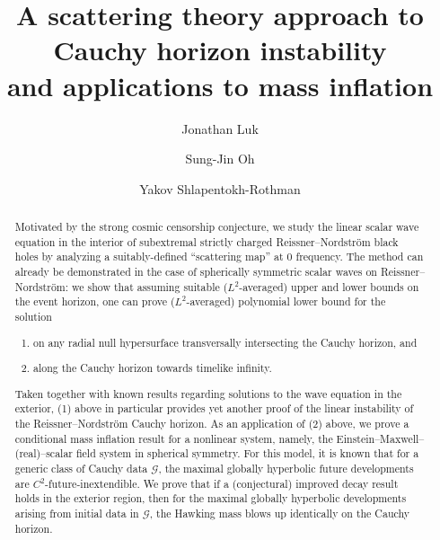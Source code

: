 \documentclass[10pt, reqno]{amsart}
\theoremstyle{definition}
\theoremstyle{remark}
\numberwithin{equation}{section}
\newcommand{\0}{\emptyset}
\begin{document}
\title[]{A scattering theory approach to Cauchy horizon instability\\ and applications to mass inflation}%

\author{Jonathan Luk}
\address{Department of Mathematics, Stanford University, 450~Serra~Mall~Building~380,~Stanford~CA~94305-2125,~USA}

\author{Sung-Jin Oh}%
\address{Department of Mathematics, UC Berkeley, Berkeley, CA 94720, USA and KIAS, Seoul, Korea 02455}%
%

\author{Yakov Shlapentokh-Rothman}
\address{Department of Mathematics, University of Toronto, 40 St. George Street, Toronto, Ontario, Canada M5S 2E4 and Department of Mathematics and Computational Sciences, 3359 Mississauga Road, Mississauga, Ontario, Canada L5L 1C6}




\begin{abstract}
Motivated by the strong cosmic censorship conjecture, we study the linear scalar wave equation in the interior of subextremal strictly charged Reissner--Nordstr\"om black holes by analyzing a suitably-defined ``scattering map'' at $0$ frequency. The method can already be demonstrated in the case of spherically symmetric scalar waves on Reissner--Nordstr\"om: we show that assuming suitable ($L^2$-averaged) upper and lower bounds on the event horizon, one can prove ($L^2$-averaged) polynomial lower bound for the solution
\begin{enumerate}
\item on any radial null hypersurface transversally intersecting the Cauchy horizon, and
\item along the Cauchy horizon towards timelike infinity.
\end{enumerate}
Taken together with known results regarding solutions to the wave equation in the exterior, (1) above in particular provides yet another proof of the linear instability of the Reissner--Nordstr\"om Cauchy horizon. As an application of (2) above, we prove a conditional mass inflation result for a nonlinear system, namely, the Einstein--Maxwell--(real)--scalar field system in spherical symmetry. For this model, it is known that for a generic class of Cauchy data $\mathcal G$, the maximal globally hyperbolic future developments are $C^2$-future-inextendible. We prove that if a (conjectural) improved decay result holds in the exterior region, then for the maximal globally hyperbolic developments arising from initial data in $\mathcal G$, the Hawking mass blows up identically on the Cauchy horizon. 
\end{abstract}
\end{document}
